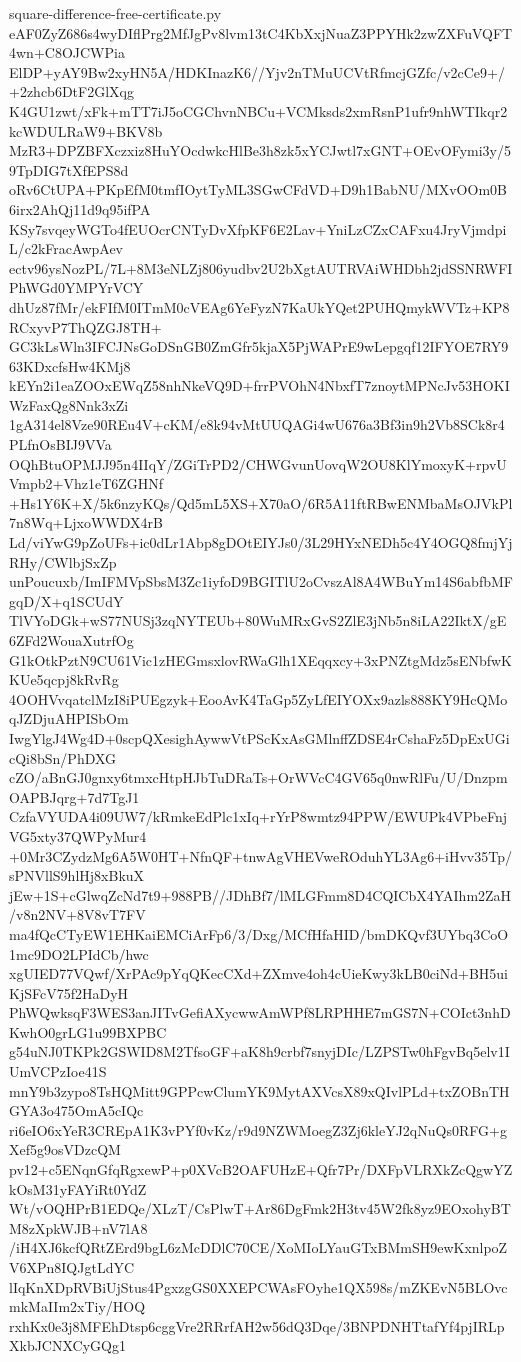 \documentclass[11pt]{article}
\theoremstyle{definition}
\theoremstyle{remark}
\begin{document}
\begin{filecontents*}[overwrite]{square-difference-free-certificate.py}
eAF0ZyZ686s4wyDIflPrg2MfJgPv8lvm13tC4KbXxjNuaZ3PPYHk2zwZXFuVQFT4wn+C8OJCWPia
ElDP+yAY9Bw2xyHN5A/HDKInazK6//Yjv2nTMuUCVtRfmcjGZfc/v2cCe9+/+2zhcb6DtF2GlXqg
K4GU1zwt/xFk+mTT7iJ5oCGChvnNBCu+VCMksds2xmRsnP1ufr9nhWTIkqr2kcWDULRaW9+BKV8b
MzR3+DPZBFXczxiz8HuYOcdwkcHlBe3h8zk5xYCJwtl7xGNT+OEvOFymi3y/59TpDIG7tXfEPS8d
oRv6CtUPA+PKpEfM0tmfIOytTyML3SGwCFdVD+D9h1BabNU/MXvOOm0B6irx2AhQj11d9q95ifPA
KSy7svqeyWGTo4fEUOcrCNTyDvXfpKF6E2Lav+YniLzCZxCAFxu4JryVjmdpiL/c2kFracAwpAev
ectv96ysNozPL/7L+8M3eNLZj806yudbv2U2bXgtAUTRVAiWHDbh2jdSSNRWFIPhWGd0YMPYrVCY
dhUz87fMr/ekFIfM0ITmM0cVEAg6YeFyzN7KaUkYQet2PUHQmykWVTz+KP8RCxyvP7ThQZGJ8TH+
GC3kLsWln3IFCJNsGoDSnGB0ZmGfr5kjaX5PjWAPrE9wLepgqf12IFYOE7RY963KDxcfsHw4KMj8
kEYn2i1eaZOOxEWqZ58nhNkeVQ9D+frrPVOhN4NbxfT7znoytMPNcJv53HOKIWzFaxQg8Nnk3xZi
1gA314el8Vze90REu4V+cKM/e8k94vMtUUQAGi4wU676a3Bf3in9h2Vb8SCk8r4PLfnOsBIJ9VVa
OQhBtuOPMJJ95n4IIqY/ZGiTrPD2/CHWGvunUovqW2OU8KlYmoxyK+rpvUVmpb2+Vhz1eT6ZGHNf
+Hs1Y6K+X/5k6nzyKQs/Qd5mL5XS+X70aO/6R5A11ftRBwENMbaMsOJVkPl7n8Wq+LjxoWWDX4rB
Ld/viYwG9pZoUFs+ic0dLr1Abp8gDOtEIYJs0/3L29HYxNEDh5c4Y4OGQ8fmjYjRHy/CWlbjSxZp
unPoucuxb/ImIFMVpSbsM3Zc1iyfoD9BGITlU2oCvszAl8A4WBuYm14S6abfbMFgqD/X+q1SCUdY
TlVYoDGk+wS77NUSj3zqNYTEUb+80WuMRxGvS2ZlE3jNb5n8iLA22IktX/gE6ZFd2WouaXutrfOg
G1kOtkPztN9CU61Vic1zHEGmsxlovRWaGlh1XEqqxcy+3xPNZtgMdz5sENbfwKKUe5qcpj8kRvRg
4OOHVvqatclMzI8iPUEgzyk+EooAvK4TaGp5ZyLfEIYOXx9azls888KY9HcQMoqJZDjuAHPISbOm
IwgYlgJ4Wg4D+0scpQXesighAywwVtPScKxAsGMlnffZDSE4rCshaFz5DpExUGicQi8bSn/PhDXG
cZO/aBnGJ0gnxy6tmxcHtpHJbTuDRaTs+OrWVcC4GV65q0nwRlFu/U/DnzpmOAPBJqrg+7d7TgJ1
CzfaVYUDA4i09UW7/kRmkeEdPlc1xIq+rYrP8wmtz94PPW/EWUPk4VPbeFnjVG5xty37QWPyMur4
+0Mr3CZydzMg6A5W0HT+NfnQF+tnwAgVHEVweROduhYL3Ag6+iHvv35Tp/sPNVllS9hlHj8xBkuX
jEw+1S+cGlwqZcNd7t9+988PB//JDhBf7/lMLGFmm8D4CQICbX4YAIhm2ZaH/v8n2NV+8V8vT7FV
ma4fQcCTyEW1EHKaiEMCiArFp6/3/Dxg/MCfHfaHID/bmDKQvf3UYbq3CoO1mc9DO2LPIdCb/hwc
xgUIED77VQwf/XrPAc9pYqQKecCXd+ZXmve4oh4cUieKwy3kLB0ciNd+BH5uiKjSFcV75f2HaDyH
PhWQwksqF3WES3anJITvGefiAXycwwAmWPf8LRPHHE7mGS7N+COIct3nhDKwhO0grLG1u99BXPBC
g54uNJ0TKPk2GSWID8M2TfsoGF+aK8h9crbf7snyjDIc/LZPSTw0hFgvBq5elv1IUmVCPzIoe41S
mnY9b3zypo8TsHQMitt9GPPcwClumYK9MytAXVcsX89xQIvlPLd+txZOBnTHGYA3o475OmA5cIQc
ri6eIO6xYeR3CREpA1K3vPYf0vKz/r9d9NZWMoegZ3Zj6kleYJ2qNuQs0RFG+gXef5g9osVDzcQM
pv12+c5ENqnGfqRgxewP+p0XVcB2OAFUHzE+Qfr7Pr/DXFpVLRXkZcQgwYZkOsM31yFAYiRt0YdZ
Wt/vOQHPrB1EDQe/XLzT/CsPlwT+Ar86DgFmk2H3tv45W2fk8yz9EOxohyBTM8zXpkWJB+nV7lA8
/iH4XJ6kcfQRtZErd9bgL6zMcDDlC70CE/XoMIoLYauGTxBMmSH9ewKxnlpoZV6XPn8IQJgtLdYC
lIqKnXDpRVBiUjStus4PgxzgGS0XXEPCWAsFOyhe1QX598s/mZKEvN5BLOvcmkMaIIm2xTiy/HOQ
rxhKx0e3j8MFEhDtsp6cggVre2RRrfAH2w56dQ3Dqe/3BNPDNHTtafYf4pjIRLpXkbJCNXCyGQg1

\end{filecontents*}
\end{document}
